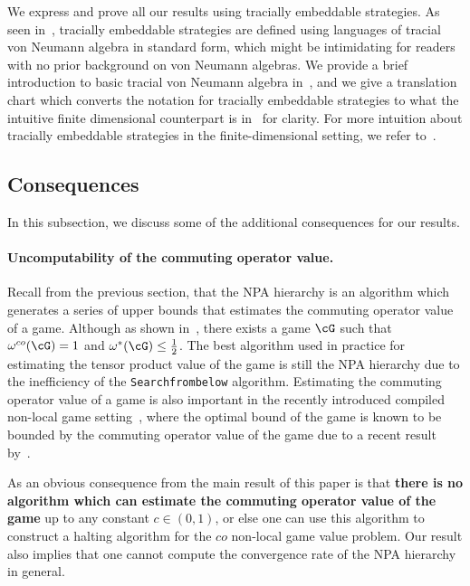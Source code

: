 We express and prove all our results using tracially embeddable strategies. As seen in~, tracially embeddable strategies are defined using languages of tracial von Neumann algebra in standard form, which might be intimidating for readers with no prior background on von Neumann algebras. We provide a brief introduction to basic tracial von Neumann algebra in~, and we give a translation chart which converts the notation for tracially embeddable strategies to what the intuitive finite dimensional counterpart is in~ for clarity.  For more intuition about tracially embeddable strategies in the finite-dimensional setting, we refer to~\cite[Example 3.3]{linTracialEmbeddableStrategies2024}. 


\subsection{Consequences}
In this subsection, we discuss some of the additional consequences for our results.

\paragraph{Uncomputability of the commuting operator value. }Recall from the previous section, that the NPA hierarchy is an algorithm which generates a series of upper bounds that estimates the commuting operator value of a game. Although as shown in~\cite[Theorem 12.10]{jiMIPRE2022a}, there exists a game $\cG$ such that $\omega^{co}(\cG) = 1$ and  $\omega^{*}(\cG) \leq \frac{1}{2}$.  The best algorithm used in practice for estimating the tensor product value of the game is still the NPA hierarchy due to the inefficiency of the \texttt{Searchfrombelow} algorithm. Estimating the commuting operator value of a game is also important in the recently introduced compiled non-local game setting~\cite{kalaiQuantumAdvantageAny2022}, where the optimal bound of the game is known to be bounded by the commuting operator value of the game due to a recent result by~\cite{kulpeBoundQuantumValue2025}. 

As an obvious consequence from the main result of this paper is that \textbf{there is no algorithm which can estimate the commuting operator value of the game} up to any constant $c \in (0,1)$, or else one can use this algorithm to construct a halting algorithm for the $co$ non-local game value problem. Our result also implies that one cannot compute the convergence rate of the NPA hierarchy in general.

